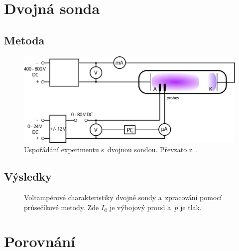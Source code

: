 \documentclass{protokol}
\newcommand\pres{p}
\newcommand\idisch{I_\mathrm{d}}
\begin{document}
\clearpage
\section{Dvojná sonda}
\label{sec:double}

\subsection{Metoda}
\label{sec:method-double}

\begin{figure}[hbp]
	\centering
	\includegraphics{diagram-double.png}
	\caption{Uspořádání experimentu s~dvojnou sondou.
		Převzato z~\autocite{assignment-doubleprobe}.}
	\label{fig:diagram-double}
\end{figure}

\subsection{Výsledky}
\label{sec:results-double}

\begin{figure}
	\centering
	
	
	\par\smallskip
	
	
	\caption{Voltampérové charakteristiky dvojné sondy
		a~zpracování pomocí průsečíkové metody.
		Zde $\idisch$ je výbojový proud a~$\pres$ je tlak.}
	\label{fig:double-vac}
\end{figure}

\section{Porovnání}
\label{sec:comparison}
\end{document}
